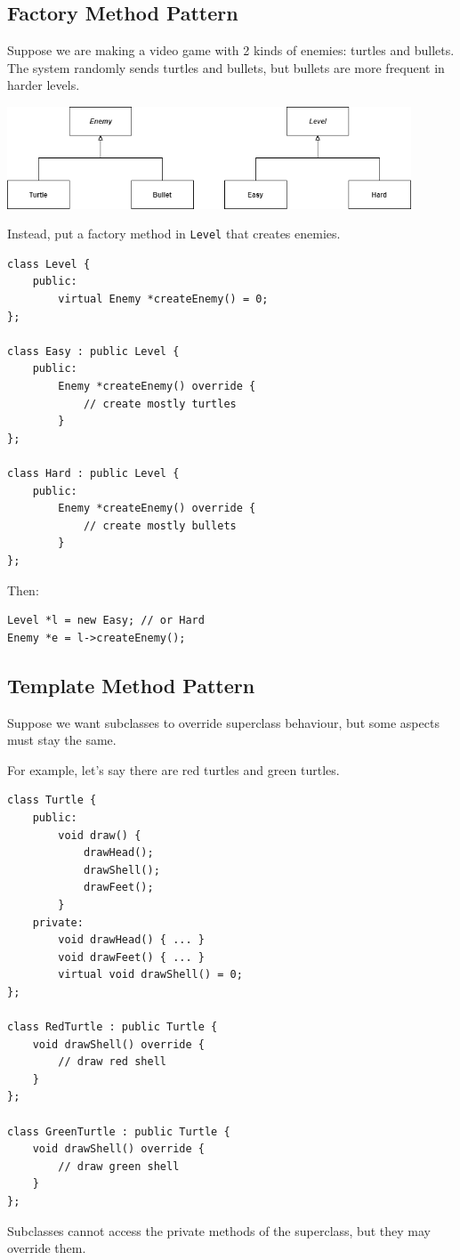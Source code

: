 \documentclass[11pt]{article}
\theoremstyle{definition}
\begin{document}
\subsection{Factory Method Pattern}
Suppose we are making a video game with 2 kinds of enemies: turtles and bullets. The system randomly sends turtles and bullets, but bullets are more frequent in harder levels.
\begin{center}
\includegraphics[width=0.9\textwidth]{images/game.png}
\end{center}
Instead, put a factory method in {\tt Level} that creates enemies.
\begin{lstlisting}
class Level {
    public:
        virtual Enemy *createEnemy() = 0;
};

class Easy : public Level {
    public:
        Enemy *createEnemy() override {
            // create mostly turtles
        }
};

class Hard : public Level {
    public:
        Enemy *createEnemy() override {
            // create mostly bullets
        }
};
\end{lstlisting}
\vspace{-0.25cm}
Then:
\begin{lstlisting}
Level *l = new Easy; // or Hard
Enemy *e = l->createEnemy();
\end{lstlisting}

\newpage
\subsection{Template Method Pattern}
Suppose we want subclasses to override superclass behaviour, but some aspects must stay the same.

For example, let's say there are red turtles and green turtles. 
\begin{lstlisting}
class Turtle {
    public:
        void draw() {
            drawHead();
            drawShell();
            drawFeet();
        }
    private:
        void drawHead() { ... }
        void drawFeet() { ... }
        virtual void drawShell() = 0;
};

class RedTurtle : public Turtle {
    void drawShell() override {
        // draw red shell
    }
};

class GreenTurtle : public Turtle {
    void drawShell() override {
        // draw green shell
    }
};
\end{lstlisting}
\vspace{-0.25cm}
Subclasses cannot access the private methods of the superclass, but they may override them.
\end{document}
